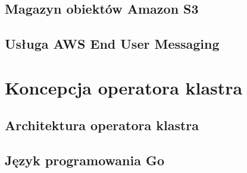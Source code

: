 \subsection{Magazyn obiektów Amazon S3}

\subsection{Usługa AWS End User Messaging}


\section{Koncepcja operatora klastra}

\subsection{Architektura operatora klastra}

\subsection{Język programowania Go}
